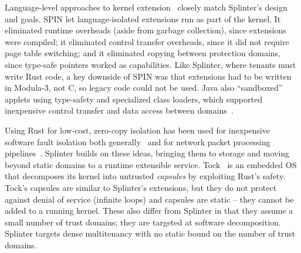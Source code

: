Language-level approaches to kernel extension~\cite{spin,singularity} closely
match Splinter's design and goals. SPIN let language-isolated extensions run
as part of the kernel. It eliminated runtime overheads (aside from garbage
collection), since extensions were compiled; it eliminated control transfer
overheads, since it did not require page table switching; and it eliminated
copying between protection domains, since type-safe pointers worked as
capabilities.
Like Splinter, where tenants must write Rust code, a
key downside of SPIN was that extensions had
to be written in Modula-3, not C, so legacy code could not be used.
%
Java also ``sandboxed'' applets using type-safety and specialized class
loaders, which supported inexpensive control transfer and data access between
domains~\cite{extensible-java}.

Using Rust for low-cost, zero-copy isolation has been used for inexpensive
  software fault isolation both generally~\cite{rust-hotos-2016} and for
  network packet processing pipelines~\cite{netbricks-2016}.
Splinter builds on these ideas, bringing them to storage and moving beyond
  static domains to a runtime extensible service.
Tock~\cite{tockos-2017} is an embedded OS that decomposes its kernel into
  untrusted \textsl{capsules} by exploiting Rust's safety. Tock's capsules
  are similar to Splinter's extensions, but they do not protect against denial of
  service (infinite loops) and capsules are static -- they cannot be added to a running kernel.
These also differ from Splinter in that they assume a small number of trust
  domains; they are targeted at software decomposition.
Splinter targets dense multitenancy with no static
  bound on the number of trust domains.


